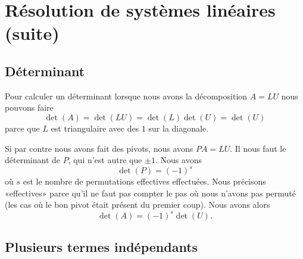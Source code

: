 
\section{Résolution de systèmes linéaires (suite)}

\subsection{Déterminant}

Pour calculer un déterminant lorsque nous avons la décomposition \( A=LU\) nous pouvons faire
\begin{equation}
	\det(A)=\det(LU)=\det(L)\det(U)=\det(U)
\end{equation}
parce que \( L\) est triangulaire avec des \( 1\) sur la diagonale.

Si par contre nous avons fait des pivots, nous avons \( PA=LU\). Il nous faut le déterminant de \( P\), qui n'est autre que \( \pm 1\). Nous avons
\begin{equation}
	\det(P)=(-1)^s
\end{equation}
où \( s\) est le nombre de permutations effectives effectuées. Nous précisons «effectives» parce qu'il ne faut pas compter le pas où nous n'avons pas permuté (les cas où le bon pivot était présent du premier coup). Nous avons alors
\begin{equation}
	\det(A)=(-1)^s\det(U).
\end{equation}

\subsection{Plusieurs termes indépendants}


